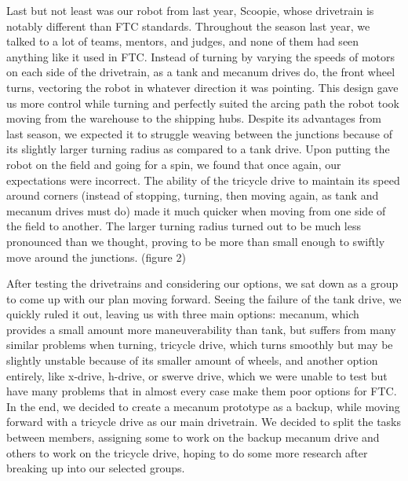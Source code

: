 Last but not least was our robot from last year, Scoopie, whose drivetrain is notably different than FTC standards. Throughout the season last year, we talked to a lot of teams, mentors, and judges, and none of them had seen anything like it used in FTC. Instead of turning by varying the speeds of motors on each side of the drivetrain, as a tank and mecanum drives do, the front wheel turns, vectoring the robot in whatever direction it was pointing. This design gave us more control while turning and perfectly suited the arcing path the robot took moving from the warehouse to the shipping hubs. Despite its advantages from last season, we expected it to struggle weaving between the junctions because of its slightly larger turning radius as compared to a tank drive. Upon putting the robot on the field and going for a spin, we found that once again, our expectations were incorrect. The ability of the tricycle drive to maintain its speed around corners (instead of stopping, turning, then moving again, as tank and mecanum drives must do) made it much quicker when moving from one side of the field to another. The larger turning radius turned out to be much less pronounced than we thought, proving to be more than small enough to swiftly move around the junctions. (figure 2)

After testing the drivetrains and considering our options, we sat down as a group to come up with our plan moving forward. Seeing the failure of the tank drive, we quickly ruled it out, leaving us with three main options: mecanum, which provides a small amount more maneuverability than tank, but suffers from many similar problems when turning, tricycle drive, which turns smoothly but may be slightly unstable because of its smaller amount of wheels, and another option entirely, like x-drive, h-drive, or swerve drive, which we were unable to test but have many problems that in almost every case make them poor options for FTC. In the end, we decided to create a mecanum prototype as a backup, while moving forward with a tricycle drive as our main drivetrain. We decided to split the tasks between members, assigning some to work on the backup mecanum drive and others to work on the tricycle drive, hoping to do some more research after breaking up into our selected groups.

